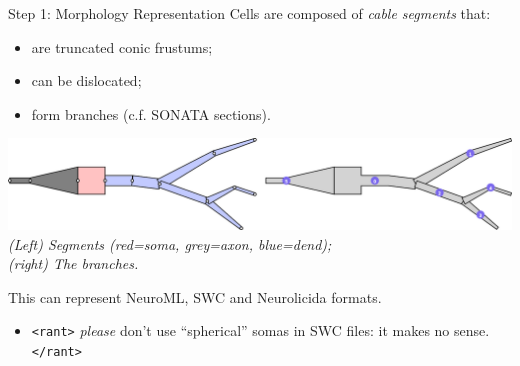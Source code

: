 \documentclass[aspectratio=43]{beamer}
\begin{document}
\begin{frame}[fragile]{Step 1: Morphology Representation}
    Cells are composed of \emph{cable segments} that:
    \begin{itemize}
        \item are truncated conic frustums;
        \item can be dislocated;
        \item form branches (c.f. SONATA sections).
    \end{itemize}

    \begin{center}
        \includegraphics[width=\textwidth]{./morphos/morphlab.png}
        \\
        \small \textit{(Left) Segments (red=soma, grey=axon, blue=dend);\\(right) The branches.}
    \end{center}

    This can represent NeuroML, SWC and Neurolicida formats.
    \begin{itemize}
        \item \texttt{<rant>} \textit{please} don't use ``spherical'' somas in SWC files: it makes no sense. \texttt{</rant>}
    \end{itemize}

\end{frame}
\end{document}
